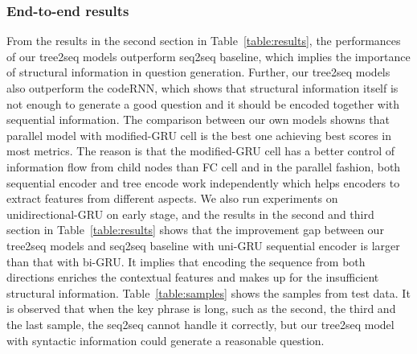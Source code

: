 \subsubsection*{End-to-end results}
From the results in the second section in Table~\ref{table:results}, 
the performances of our tree2seq models outperform seq2seq baseline, 
which implies the importance of structural information in question generation. 
Further, our tree2seq models also outperform the codeRNN, 
which shows that structural information itself is not enough to 
generate a good question and it should be encoded together 
with sequential information. The comparison between our own models 
showns that parallel model with modified-GRU cell is the best one achieving best scores in most metrics. 
The reason is that the modified-GRU cell has a better control of 
information flow from child nodes than FC cell and in the parallel fashion, 
both sequential encoder and tree encode work independently which helps 
encoders to extract features from different aspects. 
We also run experiments on unidirectional-GRU on early stage, 
and the results in the second and third section in 
Table~\ref{table:results} shows that the improvement gap between our 
tree2seq models and seq2seq baseline with uni-GRU sequential encoder 
is larger than that with bi-GRU. 
It implies that encoding the sequence from both directions enriches
the contextual features and makes up for the insufficient structural
information. 
Table~\ref{table:samples} shows the samples from test data. It is observed that when the key phrase is long, such as the second, the third and the last sample, the seq2seq cannot handle it correctly, but our tree2seq model with syntactic information could generate a reasonable question.

